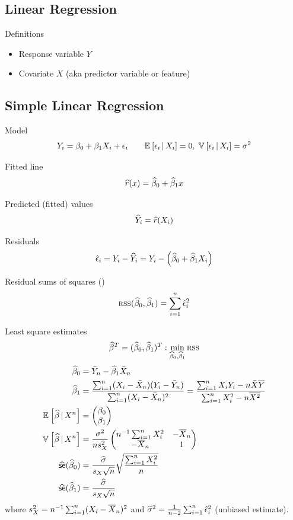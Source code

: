\documentclass[landscape]{article}
\begin{document}
\begin{multicols*}{2}
\section{Linear Regression}

Definitions
\begin{itemize}
  \item Response variable $Y$
  \item Covariate $X$ (aka predictor variable or feature)
\end{itemize}

\subsection{Simple Linear Regression}
Model
\[Y_i = \beta_0 + \beta_1 X_i + \epsilon_i
\qquad \mathbb{E}_{}\left[\epsilon_i\,|\, X_i\right] = 0 ,\; \mathbb{V}_{}\left[\epsilon_i\,|\, X_i\right] = \sigma^2\]

Fitted line
\[\widehat{r}(x) = \widehat{\beta}_0 + \widehat{\beta}_1 x\]

Predicted (fitted) values
\[\widehat{Y}_i = \widehat{r}(X_i)\]

Residuals
\[\hat{\epsilon}_i = Y_i - \widehat{Y}_i
= Y_i - \left( \widehat{\beta}_0 + \widehat{\beta}_1 X_i \right)\]

Residual sums of squares (\rss)
\[\textsc{rss}(\widehat{\beta}_0,\widehat{\beta}_1) = \sum_{i=1}^n \hat{\epsilon}_i^2\]

Least square estimates
\[\widehat{\beta}^T=(\widehat{\beta}_0, \widehat{\beta}_1)^T: \min_{\widehat{\beta}_0,\widehat{\beta}_1}\textsc{rss}\]
\begin{align*}
  \widehat{\beta}_0 &= \bar Y_n - \widehat{\beta}_1 \bar X_n \\
  \widehat{\beta}_1 &= \frac{\sum_{i=1}^n(X_i-\bar X_n)(Y_i-\bar Y_n)}{\sum_{i=1}^n(X_i - \bar X_n)^2}
           = \frac{\sum_{i=1}^n X_iY_i-n\bar{X}\overline{Y}}{\sum_{i=1}^n X_i^2 - n\overline{X^2}} \\
  \mathbb{E}_{}\left[\widehat{\beta}\,|\, X^n\right] &= \begin{pmatrix}\beta_0 \\ \beta_1\end{pmatrix} \\
  \mathbb{V}_{}\left[\widehat{\beta}\,|\, X^n\right] &=
  \frac{\sigma^2}{n s^2_X}
    \begin{pmatrix}n^{-1}\sum_{i=1}^n X_i^2 & -\overline{X}_n \\ -\overline{X}_n & 1\end{pmatrix} \\
  \widehat{\textsf{se}}(\widehat{\beta}_0) &= \frac{\widehat{\sigma}}{s_X\sqrt{n}} \sqrt{\frac{\sum_{i=1}^n X_i^2}{n}} \\
  \widehat{\textsf{se}}(\widehat{\beta}_1) &= \frac{\widehat{\sigma}}{s_X\sqrt{n}}
\end{align*}
where $s_X^2 = n^{-1} \sum_{i=1}^n(X_i-\overline{X}_n)^2$ and $\widehat{\sigma}^2 =
\frac{1}{n-2} \sum_{i=1}^n \hat{\epsilon}_i^2$ (unbiased estimate).


\end{multicols*}
\end{document}
